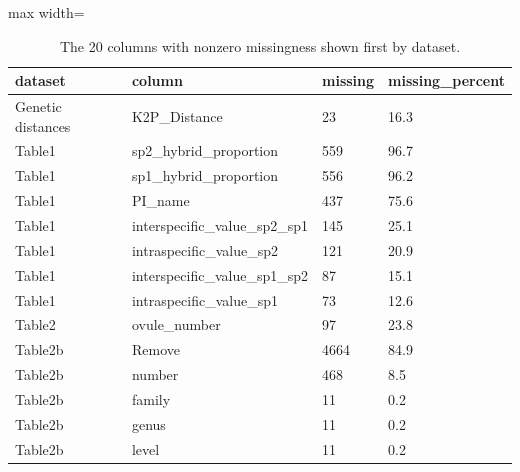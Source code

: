 \begin{table}
\caption{The 20 columns with nonzero missingness shown first by dataset.}
\label{tab:missingness_top20}
\begin{adjustbox}{max width=\textwidth}
\begin{tabular}{llll}
\toprule
dataset & column & missing & missing\_percent \\
\midrule
Genetic distances & K2P\_Distance & 23 & 16.3 \\
Table1 & sp2\_hybrid\_proportion & 559 & 96.7 \\
Table1 & sp1\_hybrid\_proportion & 556 & 96.2 \\
Table1 & PI\_name & 437 & 75.6 \\
Table1 & interspecific\_value\_sp2\_sp1 & 145 & 25.1 \\
Table1 & intraspecific\_value\_sp2 & 121 & 20.9 \\
Table1 & interspecific\_value\_sp1\_sp2 & 87 & 15.1 \\
Table1 & intraspecific\_value\_sp1 & 73 & 12.6 \\
Table2 & ovule\_number & 97 & 23.8 \\
Table2b & Remove & 4664 & 84.9 \\
Table2b & number & 468 & 8.5 \\
Table2b & family & 11 & 0.2 \\
Table2b & genus & 11 & 0.2 \\
Table2b & level & 11 & 0.2 \\
\bottomrule
\end{tabular}
\end{adjustbox}
\end{table}
